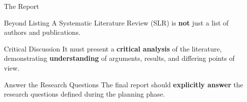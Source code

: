 \begin{frame}{The Report}
  \begin{block}{Beyond Listing}
    A Systematic Literature Review (SLR) is \textbf{not} just a list of authors and publications.
  \end{block}

  \pause

  \begin{block}{Critical Discussion}
    It must present a \textbf{critical analysis} of the literature, demonstrating \textbf{understanding} of arguments, results, and differing points of view.
  \end{block}

  \pause

  \begin{block}{Answer the Research Questions}
    The final report should \textbf{explicitly answer} the research questions defined during the planning phase.
  \end{block}
\end{frame}

